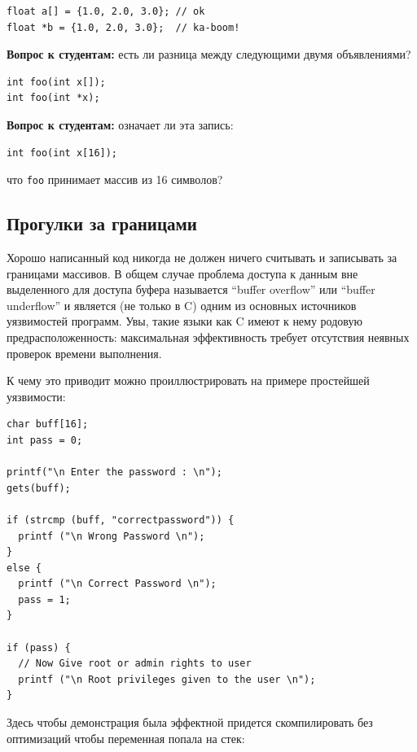 \documentclass[a4paper,12pt,oneside]{book}
\newif\ifanswers
\begin{document}
\begin{lstlisting}
float a[] = {1.0, 2.0, 3.0}; // ok
float *b = {1.0, 2.0, 3.0};  // ka-boom!
\end{lstlisting}

\textbf{Вопрос к студентам:} есть ли разница между следующими двумя объявлениями?

\begin{lstlisting}
int foo(int x[]);
int foo(int *x);
\end{lstlisting}

\ifanswers
Ответ: из-за decaying разницы нет.
\fi

\textbf{Вопрос к студентам:} означает ли эта запись:

\begin{lstlisting}
int foo(int x[16]);
\end{lstlisting}

что \lstinline!foo! принимает массив из 16 символов?

\ifanswers
Ответ: нет, здесь \lstinline!foo! принимает любой указатель.
\fi

\subsection{Прогулки за границами}\label{subsub:overruns}

Хорошо написанный код никогда не должен ничего считывать и записывать за границами массивов. В общем случае проблема доступа к данным вне выделенного для доступа буфера называется ``buffer overflow'' или ``buffer underflow'' и является (не только в C) одним из основных источников уязвимостей программ. Увы, такие языки как C имеют к нему родовую предрасположенность: максимальная эффективность требует отсутствия неявных проверок времени выполнения.

К чему это приводит можно проиллюстрировать на примере простейшей уязвимости:

\begin{lstlisting}
char buff[16];
int pass = 0;

printf("\n Enter the password : \n");
gets(buff);

if (strcmp (buff, "correctpassword")) {
  printf ("\n Wrong Password \n");
}
else {
  printf ("\n Correct Password \n");
  pass = 1;
}

if (pass) {
  // Now Give root or admin rights to user
  printf ("\n Root privileges given to the user \n");
}
\end{lstlisting}

Здесь чтобы демонстрация была эффектной придется скомпилировать без оптимизаций чтобы переменная попала на стек:
\end{document}
